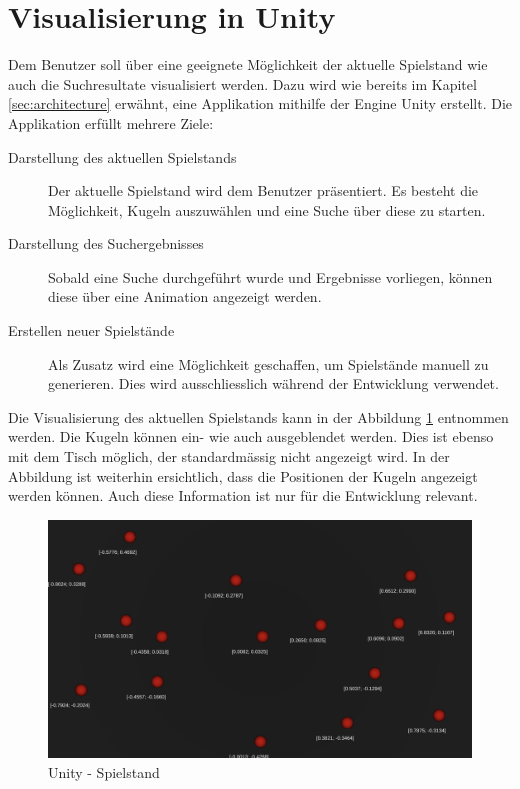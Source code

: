 \section{Visualisierung in Unity}
Dem Benutzer soll über eine geeignete Möglichkeit der aktuelle Spielstand wie auch die Suchresultate visualisiert
werden. Dazu wird wie bereits im Kapitel \ref{sec:architecture} erwähnt, eine Applikation mithilfe der Engine Unity
erstellt. Die Applikation erfüllt mehrere Ziele:
\begin{description}
    \item[Darstellung des aktuellen Spielstands] Der aktuelle Spielstand wird dem Benutzer präsentiert. Es besteht die
    Möglichkeit, Kugeln auszuwählen und eine Suche über diese zu starten.
    \item[Darstellung des Suchergebnisses] Sobald eine Suche durchgeführt wurde und Ergebnisse vorliegen, können diese
    über eine Animation angezeigt werden.
    \item[Erstellen neuer Spielstände] Als Zusatz wird eine Möglichkeit geschaffen, um Spielstände manuell zu generieren.
    Dies wird ausschliesslich während der Entwicklung verwendet.
\end{description}

Die Visualisierung des aktuellen Spielstands kann in der Abbildung \ref{fig:unity:spielstand} entnommen werden.
Die Kugeln können ein- wie auch ausgeblendet werden. Dies ist ebenso mit dem Tisch möglich, der standardmässig nicht
angezeigt wird. In der Abbildung ist weiterhin ersichtlich, dass die Positionen der Kugeln angezeigt werden können.
Auch diese Information ist nur für die Entwicklung relevant.
\begin{figure}[h!]
    \begin{center}
        \includegraphics[width=0.7\linewidth]{../common/03_billiard_ai/resources/03_unity_spielstand.png}
    \end{center}
    \caption{Unity - Spielstand}
    \label{fig:unity:spielstand}
\end{figure}